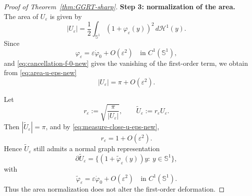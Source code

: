 \begin{proof}[Proof of Theorem~\ref{thm:GGRT-sharp}]
\medskip
\noindent
{\bf Step 3: normalization of the area.} The area of $U_\varepsilon$ is given by
\begin{equation}\label{eq:area-u-eps-new}
|U_\varepsilon|
=
\frac12\int_{\mathbb S^1} (1+\varphi_\varepsilon(y))^2\,d\mathcal H^1(y).
\end{equation}
Since
\[
\varphi_\varepsilon
=
\varepsilon \dot\varphi_0 + O(\varepsilon^2)
\quad \text{in } C^1(\mathbb S^1),
\]
and \eqref{eq:cancellation-f-0-new} gives the vanishing of the first-order
term, we obtain from \eqref{eq:area-u-eps-new}
\begin{equation}\label{eq:measure-close-u-eps-new}
|U_\varepsilon|=\pi+O(\varepsilon^2).
\end{equation}

Let
\[
r_\varepsilon:=\sqrt{\frac{\pi}{|U_\varepsilon|}},
\qquad
\widetilde U_\varepsilon:=r_\varepsilon U_\varepsilon.
\]
Then $|\widetilde U_\varepsilon|=\pi$, and by
\eqref{eq:measure-close-u-eps-new},
\[
r_\varepsilon=1+O(\varepsilon^2).
\]
Hence $\widetilde U_\varepsilon$ still admits a normal graph representation
\[
\partial \widetilde U_\varepsilon
=
\{(1+\widetilde\varphi_\varepsilon(y))y:\ y\in \mathbb S^1\},
\]
with
\[
\widetilde\varphi_\varepsilon
=
\varepsilon \dot\varphi_0 + O(\varepsilon^2)
\quad \text{in } C^1(\mathbb S^1).
\]
Thus the area normalization does not alter the first-order deformation.


\end{proof}
